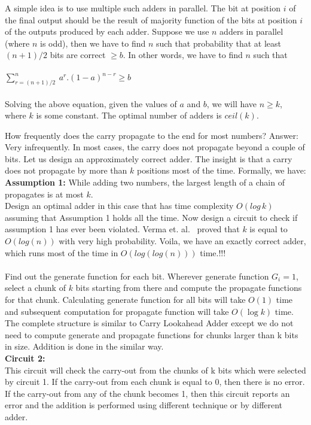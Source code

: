\begin{ExerciseList}
\Answer
A simple idea is to use multiple such adders in parallel. The bit at position $i$ of the final output should be the
result of majority function of the bits at position $i$ of the outputs produced by each adder. Suppose we use $n$ adders
in parallel (where $n$ is odd), then we have to find $n$ such that probability that at least $(n+1)/2$ bits are correct
$\geq b$. In other words, we have to find $n$ such that \\ \\ $\sum\limits_{r=(n+1)/2}^{n} \ a^{r}.(1-a)^{n-r} \geq b$
\\ \\
Solving the above equation, given the values of $a$ and $b$, we will have $n\geq k$, where $k$ is some constant. The
optimal number of adders is $ceil(k)$.

\Exercise[difficulty=3]
How frequently does the carry propagate to the end for most numbers? Answer: Very infrequently.
In most cases, the carry does not propagate beyond a couple of bits. Let us 
design an approximately correct adder. 
The insight is that a carry does not propagate by more than $k$ positions 
most of the time. Formally, we have: \\
{\bf Assumption 1:} While adding two numbers, the largest length of a chain of propagates
is at most $k$. \\

Design an optimal adder
in this case that has time complexity $O(log\, k)$ assuming that
Assumption 1 holds all the time. Now design a circuit to check if assumption 1
has ever been violated. Verma et. al.~\cite{brisk} proved that $k$ is equal to $O(log(n))$
with very high probability. Voila, we have an exactly correct adder,
which runs most of
the time in $O(log(log(n)))$ time.!!! \\


\\
Find out the generate function for each bit. Wherever generate function $G_i = 1$, select a chunk of $k$ bits starting
from there and compute the propagate functions for that chunk. Calculating generate function for all bits will take
$O(1)$ time and subsequent computation for propagate function will take $O(\log k)$ time. The complete structure is
similar to Carry Lookahead Adder except we do not need to compute generate and propagate functions for chunks larger
than k bits in size. Addition is done in the similar way.\\ {\bf Circuit 2:}\\
This circuit will check the carry-out from the chunks of k bits which were selected by circuit 1. If the carry-out from
each chunk is equal to 0, then there is no error. If the carry-out from any of the chunk becomes 1, then this circuit
reports an error and the addition is performed using different technique or by different adder.  


\end{ExerciseList}
